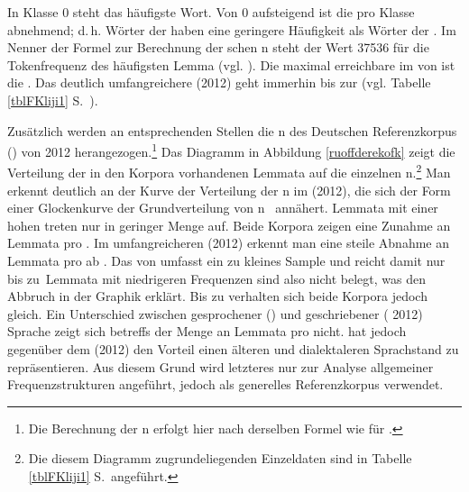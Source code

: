\largerpage
In Klasse 0 steht das häufigste Wort. Von 0 aufsteigend 
ist die  pro Klasse abnehmend; d.\,h. Wörter der  haben eine geringere Häufigkeit als Wörter der . Im Nenner der Formel zur Berechnung der \citeauthor{Ruoff1981}schen \hai{{\FK}}n steht der Wert 37536 für die Tokenfrequenz des häufigsten Lemma  (vgl. \citealt[514–516]{Ruoff1981}). Die maximal erreichbare \hai{{\FK}} im  von \citealt{Ruoff1981} ist die . Das deutlich umfangreichere  (2012) geht immerhin bis zur  (vgl. Tabelle \ref{tblFKliji1} S.\, \pageref{tblFKliji1}). 

Zusätzlich werden an entsprechenden Stellen die \hai{{\FK}}n des Deutschen Referenzkorpus () von 2012 herangezogen.\footnote{Die Berechnung der \hai{{\FK}}n erfolgt hier nach derselben Formel wie für \citealt{Ruoff1981}.} Das Diagramm in Abbildung \ref{ruoffderekofk} zeigt die Verteilung der in den Korpora vorhandenen Lemmata auf die einzelnen \hai{{\FK}}n.\footnote{Die diesem Diagramm zugrundeliegenden Einzeldaten sind in Tabelle \ref{tblFKliji1} S.\, \pageref{tblFKliji1} angeführt.} Man erkennt deutlich an der Kurve der Verteilung der \hai{{\FK}}n im  (2012), die sich der Form einer Glockenkurve der Grundverteilung von \hai{{\FK}}n \,%
annähert. Lemmata mit einer hohen  treten nur in geringer Menge auf. 
Beide Korpora zeigen eine Zunahme an Lemmata pro \hai{{\FK}}. Im umfangreicheren  (2012) erkennt man eine steile Abnahme an Lemmata pro \hai{{\FK}} ab . Das  von \citealt{Ruoff1981} umfasst ein zu kleines Sample und reicht damit nur bis zu \,Lemmata mit niedrigeren Frequenzen sind also nicht belegt, was den Abbruch in der Graphik erklärt. Bis zu  verhalten sich beide Korpora jedoch gleich. Ein Unterschied zwischen gesprochener (\citealt{Ruoff1981}) und geschriebener ( 2012) Sprache zeigt sich betreffs der Menge an Lemmata pro \hai{{\FK}} nicht. \citealt{Ruoff1981} hat jedoch gegenüber dem  (2012) den Vorteil einen älteren und dialektaleren Sprachstand zu repräsentieren. Aus diesem Grund wird letzteres nur zur Analyse allgemeiner Frequenzstrukturen angeführt, \citealt{Ruoff1981} jedoch als generelles Referenzkorpus verwendet. 


